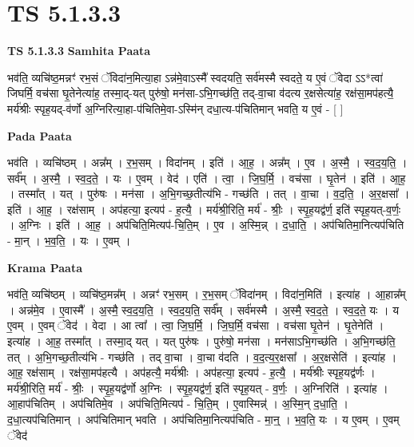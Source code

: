 \documentclass[17pt]{extarticle}
\begin{document}
\section{ TS 5.1.3.3 }

\textbf{TS 5.1.3.3 } \newline
\textbf{Samhita Paata} \newline

भव॑ति॒ व्यचि॑ष्ठ॒मन्नꣳ॑ रभ॒सं ॅविदा॑न॒मित्या॒हा ऽन्न॑मे॒वाऽस्मै᳚ स्वदयति॒ सर्व॑मस्मै स्वदते॒ य ए॒वं ॅवेदा ऽऽ*त्वा॑ जिघर्मि॒ वच॑सा घृ॒तेनेत्या॑ह॒ तस्मा॒द्-यत् पुरु॑षो॒ मन॑सा-ऽभि॒गच्छ॑ति॒ तद्-वा॒चा व॑दत्य र॒क्षसेत्या॑ह॒ रक्ष॑सा॒मप॑हत्यै॒ मर्य॑श्रीः स्पृह॒यद्-व॑र्णो अ॒ग्निरित्या॒हा-प॑चितिमे॒वा-ऽस्मि॑न् दधा॒त्य-प॑चितिमान् भवति॒ य ए॒वं - [  ] \newline

\textbf{Pada Paata} \newline

भव॑ति । व्यचि॑ष्ठम् । अन्न᳚म् । र॒भ॒सम् । विदा॑नम् । इति॑ । आ॒ह॒ । अन्न᳚म् । ए॒व । अ॒स्मै॒ । स्व॒द॒य॒ति॒ । सर्व᳚म् । अ॒स्मै॒ । स्व॒द॒ते॒ । यः । ए॒वम् । वेद॑ । एति॑ । त्वा॒ । जि॒घ॒र्मि॒ । वच॑सा । घृ॒तेन॑ । इति॑ । आ॒ह॒ । तस्मा᳚त् । यत् । पुरु॑षः । मन॑सा । अ॒भि॒गच्छ॒तीत्य॑भि - गच्छ॑ति । तत् । वा॒चा । व॒द॒ति॒ । अ॒र॒क्षसा᳚ । इति॑ । आ॒ह॒ । रक्ष॑साम् । अप॑हत्या॒ इत्यप॑ - ह॒त्यै॒ । मर्य॑श्री॒रिति॒ मर्य॑ - श्रीः॒ । स्पृ॒ह॒यद्व॑र्ण॒ इति॑ स्पृह॒यत्-व॒र्णः॒ । अ॒ग्निः । इति॑ । आ॒ह॒ । अप॑चिति॒मित्यप॑-चि॒ति॒म् । ए॒व । अ॒स्मि॒न्न् । द॒धा॒ति॒ । अप॑चितिमा॒नित्यप॑चिति - मा॒न् । भ॒व॒ति॒ । यः । ए॒वम् ।  \newline


\textbf{Krama Paata} \newline

भव॑ति॒ व्यचि॑ष्ठम् । व्यचि॑ष्ठ॒मन्न᳚म् । अन्नꣳ॑ रभ॒सम् । र॒भ॒सम् ॅविदा॑नम् । विदा॑न॒मिति॑ । इत्या॑ह । आ॒हान्न᳚म् । अन्न॑मे॒व । ए॒वास्मै᳚ । अ॒स्मै॒ स्व॒द॒य॒ति॒ । स्व॒द॒य॒ति॒ सर्व᳚म् । सर्व॑मस्मै । अ॒स्मै॒ स्व॒द॒ते॒ । स्व॒द॒ते॒ यः । य ए॒वम् । ए॒वम् ॅवेद॑ । वेदा । आ त्वा᳚ । त्वा॒ जि॒घ॒र्मि॒ । जि॒घ॒र्मि॒ वच॑सा । वच॑सा घृ॒तेन॑ । घृ॒तेनेति॑ । इत्या॑ह । आ॒ह॒ तस्मा᳚त् । तस्मा॒द् यत् । यत् पुरु॑षः । पुरु॑षो॒ मन॑सा । मन॑साऽभि॒गच्छ॑ति । अ॒भि॒गच्छ॑ति॒ तत् । अ॒भि॒गच्छ॒तीत्य॑भि - गच्छ॑ति । तद् वा॒चा । वा॒चा व॑दति । व॒द॒त्य॒र॒क्षसा᳚ । अ॒र॒क्षसेति॑ । इत्या॑ह । आ॒ह॒ रक्ष॑साम् । रक्ष॑सा॒मप॑हत्यै । अप॑हत्यै॒ मर्य॑श्रीः । अप॑हत्या॒ इत्यप॑ - ह॒त्यै॒ । मर्य॑श्रीः स्पृह॒यद्व॑र्णः । मर्य॑श्री॒रिति॒ मर्य॑ - श्रीः॒ । स्पृ॒ह॒यद्व॑र्णो अ॒ग्निः । स्पृ॒ह॒यद्व॑र्ण॒ इति॑ स्पृह॒यत् - व॒र्णः॒ । अ॒ग्निरिति॑ । इत्या॑ह । आ॒हाप॑चितिम् । अप॑चितिमे॒व । अप॑चिति॒मित्यप॑ - चि॒ति॒म् । ए॒वास्मिन्न्॑ । अ॒स्मि॒न् द॒धा॒ति॒ । द॒धा॒त्यप॑चितिमान् । अप॑चितिमान् भवति । अप॑चितिमा॒नित्यप॑चिति - मा॒न्॒ । भ॒व॒ति॒ यः । य ए॒वम् । ए॒वम् ॅवेद॑ \newline
\end{document}
